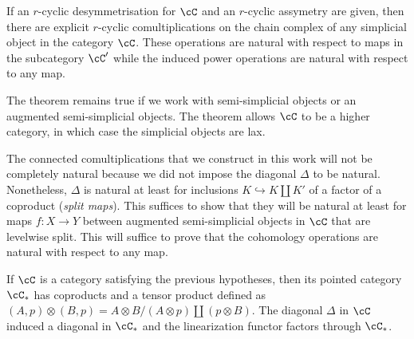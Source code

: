 
\begin{theorem}
    If an $r$-cyclic desymmetrisation for $\cC$ and an $r$-cyclic assymetry are given, then there are explicit $r$-cyclic comultiplications on the chain complex of any simplicial object in the category $\cC$. These operations are natural with respect to maps in the subcategory $\cC'$ while the induced power operations are natural with respect to any map.
\end{theorem}


    The theorem remains true if we work with semi-simplicial objects or an augmented semi-simplicial objects. The theorem allows $\cC$ to be a higher category, in which case the simplicial objects are lax.


The connected comultiplications that we construct in this work will not be completely natural because we did not impose the diagonal $\Delta$ to be natural. Nonetheless, $\Delta$ is natural at least for inclusions $K\hookrightarrow K\coprod K'$ of a factor of a coproduct (\emph{split maps}). This suffices to show that they will be natural at least for maps $f\colon X\to Y$ between augmented semi-simplicial objects in $\cC$ that are levelwise split. This will suffice to prove that the cohomology operations are natural with respect to any map.

\begin{remark}
    If $\cC$ is a category satisfying the previous hypotheses, then its pointed category $\cC_*$ has coproducts and a tensor product defined as $(A,p)\otimes (B,p) = A\otimes B/(A\otimes p)\amalg (p\otimes B)$. The diagonal $\Delta$ in $\cC$ induced a diagonal in $\cC_*$ and the linearization functor factors through $\cC_*$. 
\end{remark}

